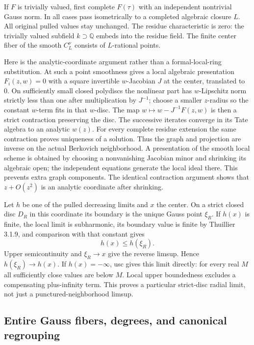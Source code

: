 \documentclass[
  10pt,
]{article}
\begin{document}
If \(F\) is trivially valued, first complete \(F(\tau)\) with an
independent nontrivial Gauss norm. In all cases pass isometrically to a
completed algebraic closure \(L\). All original pulled values stay
unchanged. The residue characteristic is zero: the trivially valued
subfield \(k\supset\mathbb Q\) embeds into the residue field. The finite
center fiber of the smooth \(C^\nu_L\) consists of \(L\)-rational
points.

Here is the analytic-coordinate argument rather than a formal-local-ring
substitution. At such a point smoothness gives a local algebraic
presentation \(F_i(z,w)=0\) with a square invertible \(w\)-Jacobian
\(J\) at the center, translated to 0. On sufficiently small closed
polydiscs the nonlinear part has \(w\)-Lipschitz norm strictly less than
one after multiplication by \(J^{-1}\); choose a smaller \(z\)-radius so
the constant \(w\)-term fits in that \(w\)-disc. The map
\(w\mapsto w-J^{-1}F(z,w)\) is then a strict contraction preserving the
disc. The successive iterates converge in its Tate algebra to an
analytic \(w(z)\). For every complete residue extension the same
contraction proves uniqueness of a solution. Thus the graph and
projection are inverse on the actual Berkovich neighborhood. A
presentation of the smooth local scheme is obtained by choosing a
nonvanishing Jacobian minor and shrinking its algebraic open; the
independent equations generate the local ideal there. This prevents
extra graph components. The identical contraction argument shows that
\(z+O(z^2)\) is an analytic coordinate after shrinking.

Let \(h\) be one of the pulled decreasing limits and \(x\) the center.
On a strict closed disc \(D_R\) in this coordinate its boundary is the
unique Gauss point \(\xi_R\). If \(h(x)\) is finite, the local limit is
subharmonic, its boundary value is finite by Thuillier 3.1.9, and
comparison with that constant gives \[
 h(x)\le h(\xi_R).
\] Upper semicontinuity and \(\xi_R\to x\) give the reverse limsup.
Hence \(h(\xi_R)\to h(x)\). If \(h(x)=-\infty\), usc gives this limit
directly: for every real \(M\) all sufficiently close values are below
\(M\). Local upper boundedness excludes a compensating plus-infinity
term. This proves a particular strict-disc radial limit, not just a
punctured-neighborhood limsup.

\subsection{Entire Gauss fibers, degrees, and canonical
regrouping}\label{entire-gauss-fibers-degrees-and-canonical-regrouping}
\end{document}
